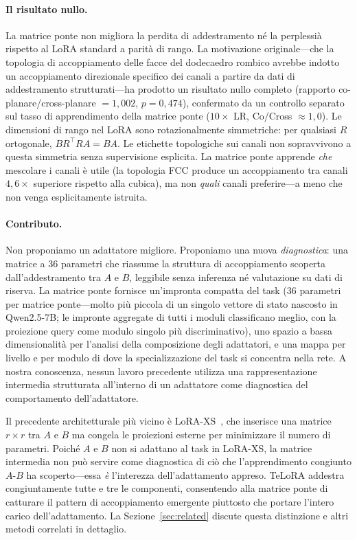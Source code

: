 \documentclass[11pt]{article}
\begin{document}
\paragraph{Il risultato nullo.}
La matrice ponte non migliora la perdita di addestramento n\'e la
perplessi\`a rispetto al LoRA standard a parit\`a di rango.
La motivazione originale---che la topologia di accoppiamento delle facce
del dodecaedro rombico avrebbe indotto un accoppiamento direzionale
specifico dei canali a partire da dati di addestramento
strutturati---ha prodotto un risultato nullo completo
(rapporto co-planare/cross-planare $= 1{,}002$, $p = 0{,}474$),
confermato da un controllo separato sul tasso di apprendimento della
matrice ponte ($10\times$ LR, Co/Cross $\approx 1{,}0$).
Le dimensioni di rango nel LoRA sono rotazionalmente simmetriche: per
qualsiasi $R$ ortogonale, $B R^\top R A = BA$.
Le etichette topologiche sui canali non sopravvivono a questa simmetria
senza supervisione esplicita.
La matrice ponte apprende \emph{che} mescolare i canali \`e utile
(la topologia FCC produce un accoppiamento tra canali $4{,}6\times$
superiore rispetto alla cubica), ma non \emph{quali} canali
preferire---a meno che non venga esplicitamente istruita.

\paragraph{Contributo.}
Non proponiamo un adattatore migliore.
Proponiamo una nuova \emph{diagnostica}: una matrice a 36 parametri che
riassume la struttura di accoppiamento scoperta dall'addestramento tra
$A$ e $B$, leggibile senza inferenza n\'e valutazione su dati di
riserva.
La matrice ponte fornisce un'impronta compatta del task (36 parametri
per matrice ponte---molto pi\`u piccola di un singolo vettore di stato
nascosto in Qwen2.5-7B; le impronte aggregate di tutti i moduli
classificano meglio, con la proiezione query come modulo singolo pi\`u
discriminativo), uno spazio a bassa
dimensionalit\`a per l'analisi della composizione degli adattatori, e
una mappa per livello e per modulo di dove la specializzazione del task
si concentra nella rete.
A nostra conoscenza, nessun lavoro precedente utilizza una
rappresentazione intermedia strutturata all'interno di un adattatore
come diagnostica del comportamento dell'adattatore.

Il precedente architetturale pi\`u vicino \`e LoRA-XS~\cite{banaei2024loraxs},
che inserisce una matrice $r \times r$ tra $A$ e $B$ ma congela le
proiezioni esterne per minimizzare il numero di parametri.
Poich\'e $A$ e $B$ non si adattano al task in LoRA-XS, la matrice
intermedia non pu\`o servire come diagnostica di ci\`o che
l'apprendimento congiunto $A$-$B$ ha scoperto---essa \emph{\`e}
l'interezza dell'adattamento appreso.
TeLoRA addestra congiuntamente tutte e tre le componenti,
consentendo alla matrice ponte di catturare il pattern di accoppiamento
emergente piuttosto che portare l'intero carico dell'adattamento.
La Sezione~\ref{sec:related} discute questa distinzione e altri metodi
correlati in dettaglio.
\end{document}

